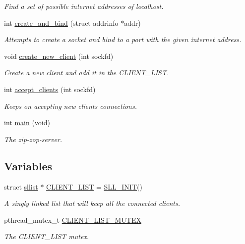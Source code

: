 \begin{DoxyCompactItemize}
\begin{DoxyCompactList}\small\item\em Find a set of possible internet addresses of localhost. \end{DoxyCompactList}\item 
int \hyperlink{zip-zop-server_8c_a0ecdeaf556729d827a07915b7a89866c}{create\+\_\+and\+\_\+bind} (struct addrinfo $\ast$addr)
\begin{DoxyCompactList}\small\item\em Attempts to create a socket and bind to a port with the given internet address. \end{DoxyCompactList}\item 
void \hyperlink{zip-zop-server_8c_ab9a14cd690eac9781dd224e034fbd01d}{create\+\_\+new\+\_\+client} (int sockfd)
\begin{DoxyCompactList}\small\item\em Create a new client and add it in the {\ttfamily C\+L\+I\+E\+N\+T\+\_\+\+L\+I\+ST}. \end{DoxyCompactList}\item 
int \hyperlink{zip-zop-server_8c_acd1dc66d1afd8edcd165dc3f6855d355}{accept\+\_\+clients} (int sockfd)
\begin{DoxyCompactList}\small\item\em Keeps on accepting new clients connections. \end{DoxyCompactList}\item 
int \hyperlink{zip-zop-server_8c_a840291bc02cba5474a4cb46a9b9566fe}{main} (void)
\begin{DoxyCompactList}\small\item\em The zip-\/zop-\/server. \end{DoxyCompactList}\end{DoxyCompactItemize}
\subsection*{Variables}
\begin{DoxyCompactItemize}
\item 
struct \hyperlink{structsllist}{sllist} $\ast$ \hyperlink{zip-zop-server_8c_a32076dcdfaf1057a014d74d01cc7e08e}{C\+L\+I\+E\+N\+T\+\_\+\+L\+I\+ST} = \hyperlink{sllist_8h_a4f1348bb9eb6fe8c2b112e39c1887290}{S\+L\+L\+\_\+\+I\+N\+IT}()
\begin{DoxyCompactList}\small\item\em A singly linked list that will keep all the connected clients. \end{DoxyCompactList}\item 
pthread\+\_\+mutex\+\_\+t \hyperlink{zip-zop-server_8c_ac58873310e66c9bfafdbc798a8a7c7e2}{C\+L\+I\+E\+N\+T\+\_\+\+L\+I\+S\+T\+\_\+\+M\+U\+T\+EX}
\begin{DoxyCompactList}\small\item\em The {\ttfamily C\+L\+I\+E\+N\+T\+\_\+\+L\+I\+ST} mutex. \end{DoxyCompactList}\end{DoxyCompactItemize}


